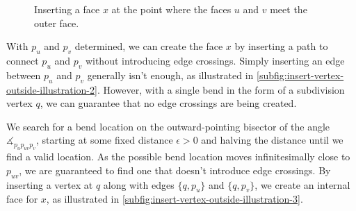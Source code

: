 \begin{figure}[H]
	\centering
	\quad
	\quad
	\caption{Inserting a face $x$ at the point where the faces $u$ and $v$ meet the outer face.}
	\label{fig:insert-vertex-outside-illustration}
\end{figure}

With $p_u$ and $p_v$ determined, we can create the face $x$ by inserting a path to connect $p_u$ and $p_v$ without introducing edge crossings. Simply inserting an edge between $p_u$ and $p_v$ generally isn't enough, as illustrated in \cref{subfig:insert-vertex-outside-illustration-2}. However, with a single bend in the form of a subdivision vertex $q$, we can guarantee that no edge crossings are being created.

We search for a bend location on the outward-pointing bisector of the angle $\measuredangle_{p_up_{uv}p_v}$, starting at some fixed distance $\epsilon > 0$ and halving the distance until we find a valid location. As the possible bend location moves infinitesimally close to $p_{uv}$, we are guaranteed to find one that doesn't introduce edge crossings. By inserting a vertex at $q$ along with edges $\{q,p_u\}$ and $\{q,p_v\}$, we create an internal face for $x$, as illustrated in \cref{subfig:insert-vertex-outside-illustration-3}.
